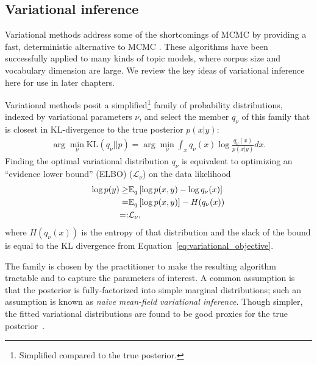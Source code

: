 \subsection{Variational inference}
\label{sec:variational_inference}

Variational methods address some of the shortcomings of MCMC by
providing a fast, deterministic alternative to MCMC
\citep{jordan:2003,jordan:1999}. These algorithms have been
successfully applied to many kinds of topic models, where corpus size
and vocabulary dimension are large.  We review the key ideas of
variational inference here for use in later chapters.

Variational methods posit a simplified\footnote{Simplified compared to
  the true posterior.} family of probability distributions, indexed by
variational parameters $\nu$, and select the member $q_{\nu}$ of
this family that is closest in KL-divergence to the true posterior
$p(x | y)$:
\begin{align}
  \arg \min_{\nu} \mbox{KL}(q_{\nu} || p) = \arg \min_{{\nu}} \int_x q_{\nu}(x) \log \frac{q_{\nu}(x)}{p(x | y)} dx.
  \label{eq:variational_objective}
\end{align}
Finding the optimal variational distribution $q_\nu$ is equivalent
to optimizing an ``evidence lower bound'' (ELBO) ($\mathcal{L}_\nu$) on
the data likelihood
\begin{eqnarray}
  \log p(y) \ge & \mathbb{E}_q\left[\log p(x, y) - \log q_\nu(x)\right] \\
  = & \mathbb{E}_q\left[\log p(x, y)\right] - H(q_\nu(x)) \\
  =: & \mathcal{L}_\nu,
  \label{eq:traditional_variational_objective}
\end{eqnarray}
where $H(q_\nu(x))$ is the entropy of that distribution and the
slack of the bound is equal to the KL divergence from
Equation~\ref{eq:variational_objective}.

The family is chosen by the practitioner to make the resulting
algorithm tractable and to capture the parameters of interest. A
common assumption is that the posterior is fully-factorized into
simple marginal distributions; such an assumption is known as
\emph{naive mean-field variational inference}. Though simpler, the
fitted variational distributions are found to be good proxies for the
true posterior~\citep{jordan:1999,gerrish:2011}.

